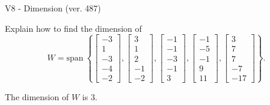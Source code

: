 \begin{exercise}
  \begin{exerciseTitle}V8 - Dimension (ver. 487)\end{exerciseTitle}
  \begin{exerciseStatement}
    Explain how to find the dimension of 
\[W=\mathrm{span}\ \left\{\left[\begin{array}{r}
-3 \\
1 \\
-3 \\
-4 \\
-2
\end{array}\right] , \left[\begin{array}{r}
3 \\
1 \\
2 \\
-1 \\
-2
\end{array}\right] , \left[\begin{array}{r}
-1 \\
-1 \\
-3 \\
-1 \\
3
\end{array}\right] , \left[\begin{array}{r}
-1 \\
-5 \\
-1 \\
9 \\
11
\end{array}\right] , \left[\begin{array}{r}
3 \\
7 \\
7 \\
-7 \\
-17
\end{array}\right]\right\}.\]



  \end{exerciseStatement}
  \begin{exerciseAnswer}
   The dimension of \(W\) is  \(3\).
  


  \end{exerciseAnswer}
\end{exercise}